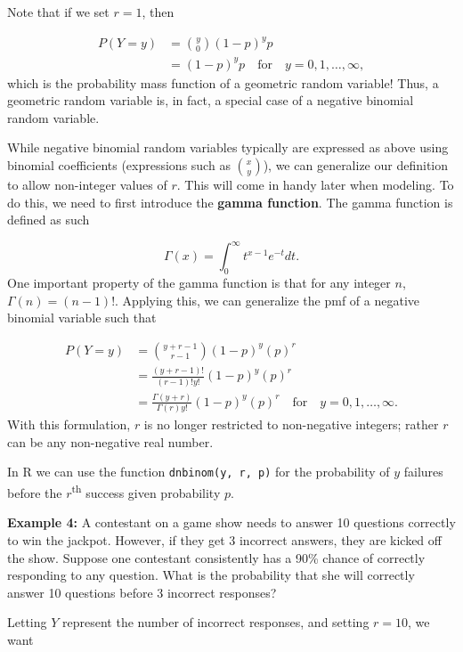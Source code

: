 \documentclass[
]{krantz}
\begin{document}
Note that if we set \(r=1\), then

\begin{align*}
 P(Y=y) &= \binom{y}{0} (1-p)^yp \\
        &= (1-p)^yp \quad \textrm{for} \quad y = 0, 1, \ldots, \infty,
\end{align*}
which is the probability mass function of a geometric random variable! Thus, a geometric random variable is, in fact, a special case of a negative binomial random variable.

While negative binomial random variables typically are expressed as above using binomial coefficients (expressions such as \(\binom{x}{y}\)), we can generalize our definition to allow non-integer values of \(r\). This will come in handy later when modeling. To do this, we need to first introduce the \textbf{gamma function}.  The gamma function is defined as such

\begin{equation}
\Gamma(x)  = \int_0^\infty t^{x-1} e^{-t}dt.
\label{eq:gammaFun}
\end{equation}
One important property of the gamma function is that for any integer \(n\), \(\Gamma(n) = (n-1)!\). Applying this, we can generalize the pmf of a negative binomial variable such that

\begin{align*}
 P(Y=y) &= \binom{y + r - 1}{r-1}           (1-p)^{y}(p)^r \\
        &= \frac{(y+r-1)!}{(r-1)!y!}         (1-p)^{y}(p)^r \\
        &= \frac{\Gamma(y+r)}{\Gamma(r) y!}  (1-p)^{y}(p)^r \quad \textrm{for} \quad y = 0, 1, \ldots, \infty.
\end{align*}
With this formulation, \(r\) is no longer restricted to non-negative integers; rather \(r\) can be any non-negative real number.

In R we can use the function \texttt{dnbinom(y,\ r,\ p)} for the probability of \(y\) failures before the \(r\)\textsuperscript{th} success given probability \(p\).

\textbf{Example 4:} A contestant on a game show needs to answer 10 questions correctly to win the jackpot. However, if they get 3 incorrect answers, they are kicked off the show. Suppose one contestant consistently has a 90\% chance of correctly responding to any question. What is the probability that she will correctly answer 10 questions before 3 incorrect responses?

Letting \(Y\) represent the number of incorrect responses, and setting \(r = 10\), we want
\end{document}
